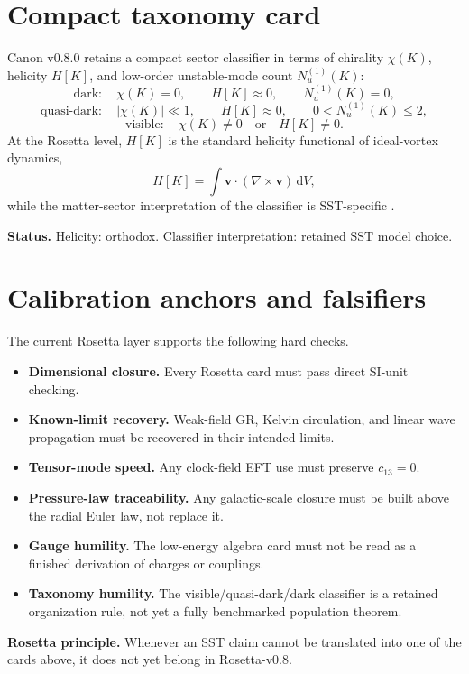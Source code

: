 \documentclass[11pt,a4paper]{article}
\newcommand{\dd}{\mathrm d}
\newcommand{\RosettaCard}[1]{\begin{tcolorbox}[colback=blue!4,colframe=blue!60!black,boxrule=0.6pt,arc=3pt,title={#1}]}
\newcommand{\EndRosettaCard}{\end{tcolorbox}}
\begin{document}
\section{Compact taxonomy card}
\RosettaCard{Rosetta Card 8: visible, quasi-dark, and dark classifier}
Canon v0.8.0 retains a compact sector classifier in terms of chirality \(\chi(K)\), helicity \(H[K]\), and low-order unstable-mode count \(N_u^{(1)}(K)\):
\[
\text{dark}:\quad \chi(K)=0,\qquad H[K]\approx 0,\qquad N_u^{(1)}(K)=0,
\]
\[
\text{quasi-dark}:\quad |\chi(K)|\ll 1,\qquad H[K]\approx 0,\qquad 0<N_u^{(1)}(K)\le 2,
\]
\[
\text{visible}:\quad \chi(K)\neq 0\quad \text{or}\quad H[K]\neq 0.
\]
At the Rosetta level, \(H[K]\) is the standard helicity functional of ideal-vortex dynamics,
\[
H[K]=\int \mathbf v\cdot(\nabla\times\mathbf v)\,\dd V,
\]
while the matter-sector interpretation of the classifier is SST-specific \cite{SSTCanon08, Moffatt1969, Arnold1998}.\par
\medskip
\textbf{Status.} Helicity: orthodox. Classifier interpretation: retained SST model choice.
\EndRosettaCard

\section{Calibration anchors and falsifiers}
\RosettaCard{Rosetta Card 9: calibration and failure modes}
The current Rosetta layer supports the following hard checks.
\begin{itemize}
  \item \textbf{Dimensional closure.} Every Rosetta card must pass direct SI-unit checking.
  \item \textbf{Known-limit recovery.} Weak-field GR, Kelvin circulation, and linear wave propagation must be recovered in their intended limits.
  \item \textbf{Tensor-mode speed.} Any clock-field EFT use must preserve \(c_{13}=0\).
  \item \textbf{Pressure-law traceability.} Any galactic-scale closure must be built above the radial Euler law, not replace it.
  \item \textbf{Gauge humility.} The low-energy algebra card must not be read as a finished derivation of charges or couplings.
  \item \textbf{Taxonomy humility.} The visible/quasi-dark/dark classifier is a retained organization rule, not yet a fully benchmarked population theorem.
\end{itemize}
\textbf{Rosetta principle.} Whenever an SST claim cannot be translated into one of the cards above, it does not yet belong in Rosetta-v0.8.
\EndRosettaCard
\end{document}

